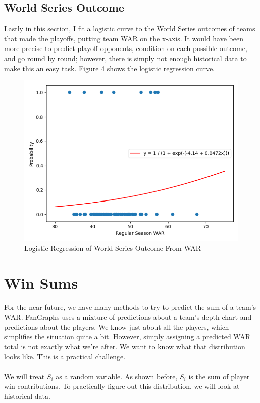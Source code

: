 \documentclass[11pt]{article}
\begin{document}
\subsection{World Series Outcome}

Lastly in this section, I fit a logistic curve to the World Series outcomes of teams that made the playoffs, putting team WAR on the x-axis. It would have been more precise to predict playoff opponents, condition on each possible outcome, and go round by round; however, there is simply not enough historical data to make this an easy task. Figure 4 shows the logistic regression curve.

\begin{figure}
  \includegraphics[width=\linewidth]{figure4.png}
  \caption{Logistic Regression of World Series Outcome From WAR}
  \label{fig:figure4}
\end{figure} 

\section{Win Sums}

For the near future, we have many methods to try to predict the sum of a team's WAR. FanGraphs uses a mixture of predictions about a team's depth chart and predictions about the players. We know just about all the players, which simplifies the situation quite a bit. However, simply assigning a predicted WAR total is not exactly what we're after. We want to know what that distribution looks like. This is a practical challenge.\\\\
We will treat $S_i$ as a random variable. As shown before, $S_i$ is the sum of player win contributions. To practically figure out this distribution, we will look at historical data.
\end{document}
